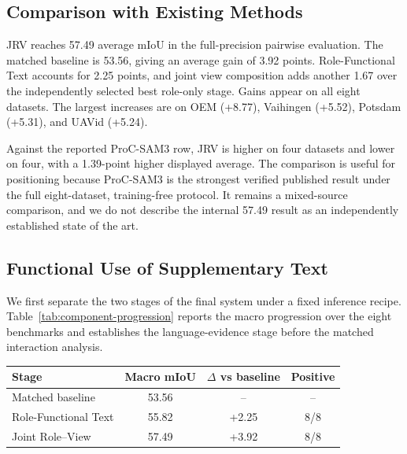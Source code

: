 \subsection{Comparison with Existing Methods}



JRV reaches 57.49 average mIoU in the full-precision pairwise evaluation. The matched baseline is 53.56, giving an average gain of 3.92 points. Role-Functional Text accounts for 2.25 points, and joint view composition adds another 1.67 over the independently selected best role-only stage. Gains appear on all eight datasets. The largest increases are on OEM (+8.77), Vaihingen (+5.52), Potsdam (+5.31), and UAVid (+5.24).

Against the reported ProC-SAM3 row, JRV is higher on four datasets and lower on four, with a 1.39-point higher displayed average. The comparison is useful for positioning because ProC-SAM3 is the strongest verified published result under the full eight-dataset, training-free protocol. It remains a mixed-source comparison, and we do not describe the internal 57.49 result as an independently established state of the art.

\subsection{Functional Use of Supplementary Text}

We first separate the two stages of the final system under a fixed inference recipe. Table~\ref{tab:component-progression} reports the macro progression over the eight benchmarks and establishes the language-evidence stage before the matched interaction analysis.

\begin{center}
\centering
\captionsetup{hypcap=false}
\label{tab:component-progression}
\captionsetup{hypcap=true}
\small
\setlength{\tabcolsep}{3pt}
\begin{tabular}{lccc}
\toprule
Stage & Macro mIoU & $\Delta$ vs baseline & Positive \\
\midrule
Matched baseline & 53.56 & -- & -- \\
Role-Functional Text & 55.82 & +2.25 & 8/8 \\
Joint Role--View & 57.49 & +3.92 & 8/8 \\
\bottomrule
\end{tabular}
\end{center}

